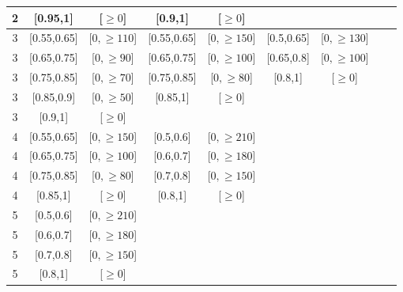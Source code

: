 \begin{table}
\begin{adjustwidth}{-0.5in}{-1in}
\begin{tabular}{c|cc|cc|cc|cc|}
2 & [0.95,1] & [$\geq 0$]  &[0.9,1] & [$\geq 0$]  &  &   &  &   \\
\hline
3 & [0.55,0.65] & [$0,\geq 110$]  &[0.55,0.65] & [$0,\geq 150$]  &[0.5,0.65] & [$0,\geq 130$]  & &   \\
3 & [0.65,0.75] & [$0,\geq 90$]  &[0.65,0.75] & [$0,\geq 100$]  &[0.65,0.8] & [$0,\geq 100$]  & &   \\
3 & [0.75,0.85] & [$0,\geq 70$]  &[0.75,0.85] & [$0,\geq 80$]  &[0.8,1] & [$\geq 0$]  & &   \\
3 & [0.85,0.9] & [$0,\geq 50$]  &[0.85,1] & [$\geq 0$]  &  &   &  &   \\
3 & [0.9,1] & [$\geq 0$]  &  &   &   &   &  &   \\
\hline
4 & [0.55,0.65] & [$0,\geq 150$]  &[0.5,0.6] & [$0,\geq 210$]  &  &   &  &   \\
4 & [0.65,0.75] & [$0,\geq 100$]  &[0.6,0.7] & [$0,\geq 180$]  &  &   &  &   \\
4 & [0.75,0.85] & [$0,\geq 80$]  &[0.7,0.8] & [$0,\geq 150$]  &  &   &  &   \\
4 & [0.85,1] & [$\geq 0$]  &[0.8,1] & [$\geq 0$]  &  &   &  &   \\
\hline
5 & [0.5,0.6] & [$0,\geq 210$]  &  &   &   &   &  &   \\
5 & [0.6,0.7] & [$0,\geq 180$]  &  &   &   &   &  &   \\
5 & [0.7,0.8] & [$0,\geq 150$]  &  &   &   &   &  &   \\
5 & [0.8,1] & [$\geq 0$]  &  &   &   &   &  &   \\
\hline
\end{tabular}
\end{adjustwidth}
\label{tab:allkinbin}
\end{table}

